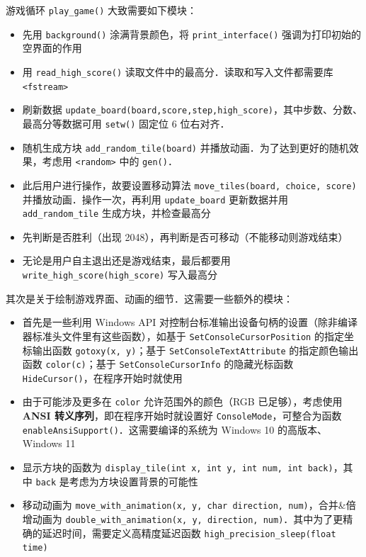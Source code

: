 \documentclass[12pt,a4paper,twoside]{ctexart}
\numberwithin{figure}{section}
\numberwithin{equation}{section}
\begin{document}
游戏循环 \verb|play_game()| 大致需要如下模块：
\begin{itemize}
    \item 先用 \verb|background()| 涂满背景颜色，将 \verb|print_interface()| 强调为打印初始的空界面的作用
    \item 用 \verb|read_high_score()| 读取文件中的最高分．读取和写入文件都需要库 \verb|<fstream>|
    \item 刷新数据 \verb|update_board(board,score,step,high_score)|，其中步数、分数、最高分等数据可用 \verb|setw()| 固定位 6 位右对齐．
    \item 随机生成方块 \verb|add_random_tile(board)| 并播放动画．为了达到更好的随机效果，考虑用 \verb|<random>| 中的 \verb|gen()|．
    \item 此后用户进行操作，故要设置移动算法 \verb|move_tiles(board, choice, score)| 并播放动画．操作一次，再利用 \verb|update_board| 更新数据并用 \verb|add_random_tile| 生成方块，并检查最高分
    \item 先判断是否胜利（出现 2048），再判断是否可移动（不能移动则游戏结束）
    \item 无论是用户自主退出还是游戏结束，最后都要用 \verb|write_high_score(high_score)| 写入最高分
\end{itemize}

其次是关于绘制游戏界面、动画的细节．这需要一些额外的模块：
\begin{itemize}
    \item 首先是一些利用 Windows API 对控制台标准输出设备句柄的设置（除非编译器标准头文件里有这些函数），如基于 \verb|SetConsoleCursorPosition| 的指定坐标输出函数 \verb|gotoxy(x, y)|；基于 \verb|SetConsoleTextAttribute| 的指定颜色输出函数 \verb|color(c)|；基于 \verb|SetConsoleCursorInfo| 的隐藏光标函数 \verb|HideCursor()|，在程序开始时就使用
    \item 由于可能涉及更多在 \verb|color| 允许范围外的颜色（RGB 已足够），考虑使用 \textbf{ANSI 转义序列}，即在程序开始时就设置好 \verb|ConsoleMode|，可整合为函数 \verb|enableAnsiSupport()|．这需要编译的系统为 Windows 10 的高版本、Windows 11
    \item 显示方块的函数为 \verb|display_tile(int x, int y, int num, int back)|，其中 \verb|back| 是考虑为方块设置背景的可能性
    \item 移动动画为 \verb|move_with_animation(x, y, char direction, num)|，合并\&倍增动画为 \verb|double_with_animation(x, y, direction, num)|．其中为了更精确的延迟时间，需要定义高精度延迟函数 \verb|high_precision_sleep(float time)|
\end{itemize}
\end{document}
